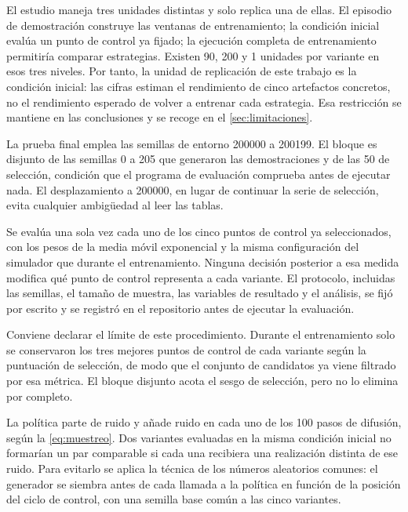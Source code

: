 El estudio maneja tres unidades distintas y solo replica una de ellas. El episodio de
demostraci\'on construye las ventanas de entrenamiento; la condici\'on inicial eval\'ua un
punto de control ya fijado; la ejecuci\'on completa de entrenamiento permitir\'ia comparar
estrategias. Existen \num{90}, \num{200} y \num{1} unidades por variante en esos tres
niveles. Por tanto, la unidad de replicaci\'on de este trabajo es la condici\'on inicial:
las cifras estiman el rendimiento de cinco artefactos concretos, no el rendimiento
esperado de volver a entrenar cada estrategia. Esa restricci\'on se mantiene en las
conclusiones y se recoge en el \cref{sec:limitaciones}.


La prueba final emplea las semillas de entorno \num{200000} a \num{200199}. El bloque es
disjunto de las semillas \num{0} a \num{205} que generaron las demostraciones y de las
\num{50} de selecci\'on, condici\'on que el programa de evaluaci\'on comprueba antes de
ejecutar nada. El desplazamiento a \num{200000}, en lugar de continuar la serie de
selecci\'on, evita cualquier ambig\"uedad al leer las tablas.

Se eval\'ua una sola vez cada uno de los cinco puntos de control ya seleccionados, con los
pesos de la media m\'ovil exponencial y la misma configuraci\'on del simulador que durante
el entrenamiento. Ninguna decisi\'on posterior a esa medida modifica qu\'e punto de control
representa a cada variante. El protocolo, incluidas las semillas, el tama\~no de muestra,
las variables de resultado y el an\'alisis, se fij\'o por escrito y se registr\'o en el
repositorio antes de ejecutar la evaluaci\'on.

Conviene declarar el l\'imite de este procedimiento. Durante el entrenamiento solo se
conservaron los tres mejores puntos de control de cada variante seg\'un la puntuaci\'on de
selecci\'on, de modo que el conjunto de candidatos ya viene filtrado por esa m\'etrica. El
bloque disjunto acota el sesgo de selecci\'on, pero no lo elimina por completo.


La pol\'itica parte de ruido y a\~nade ruido en cada uno de los \num{100} pasos de
difusi\'on, seg\'un la \cref{eq:muestreo}. Dos variantes evaluadas en la misma condici\'on
inicial no formar\'ian un par comparable si cada una recibiera una realizaci\'on distinta
de ese ruido. Para evitarlo se aplica la t\'ecnica de los n\'umeros aleatorios comunes: el
generador se siembra antes de cada llamada a la pol\'itica en funci\'on de la posici\'on
del ciclo de control, con una semilla base com\'un a las cinco variantes.

